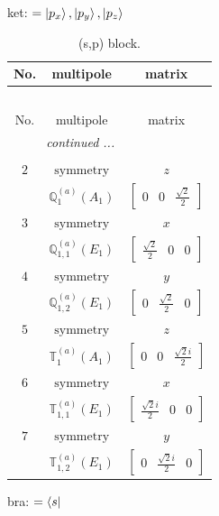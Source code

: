 \documentclass[fleqn,8pt,landscape]{jsarticle}
\begin{document}
\noindent
ket: $=\ket{p_{x}}, \ket{p_{y}}, \ket{p_{z}}$
\renewcommand{\arraystretch}{1.6}
\begin{longtable}{ccc}
\caption{(s,p) block.}
 \\
 \hline \hline
No. & multipole & matrix \\ \hline \endfirsthead

\multicolumn{2}{l}{\tablename\ \thetable{}} \\
 \hline \hline
No. & multipole & matrix \\ \hline \endhead

 \hline \hline
\multicolumn{2}{r}{\footnotesize\it continued ...} \\ \endfoot

 \hline \hline
\multicolumn{2}{r}{} \\ \endlastfoot

$ 2 $ & $ \text{symmetry} $ & $ z $ \\
$  $ & $ \mathbb{Q}_{1}^{(a)}(A_{1}) $ & $ \begin{bmatrix} 0 & 0 & \frac{\sqrt{2}}{2} \end{bmatrix} $ \\ \hline
$ 3 $ & $ \text{symmetry} $ & $ x $ \\
$  $ & $ \mathbb{Q}_{1,1}^{(a)}(E_{1}) $ & $ \begin{bmatrix} \frac{\sqrt{2}}{2} & 0 & 0 \end{bmatrix} $ \\ \hline
$ 4 $ & $ \text{symmetry} $ & $ y $ \\
$  $ & $ \mathbb{Q}_{1,2}^{(a)}(E_{1}) $ & $ \begin{bmatrix} 0 & \frac{\sqrt{2}}{2} & 0 \end{bmatrix} $ \\ \hline
$ 5 $ & $ \text{symmetry} $ & $ z $ \\
$  $ & $ \mathbb{T}_{1}^{(a)}(A_{1}) $ & $ \begin{bmatrix} 0 & 0 & \frac{\sqrt{2} i}{2} \end{bmatrix} $ \\ \hline
$ 6 $ & $ \text{symmetry} $ & $ x $ \\
$  $ & $ \mathbb{T}_{1,1}^{(a)}(E_{1}) $ & $ \begin{bmatrix} \frac{\sqrt{2} i}{2} & 0 & 0 \end{bmatrix} $ \\ \hline
$ 7 $ & $ \text{symmetry} $ & $ y $ \\
$  $ & $ \mathbb{T}_{1,2}^{(a)}(E_{1}) $ & $ \begin{bmatrix} 0 & \frac{\sqrt{2} i}{2} & 0 \end{bmatrix} $ \\ \hline
\end{longtable}
bra: $=\bra{s}$
\end{document}
